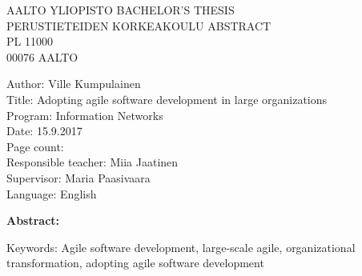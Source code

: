 
\begin{flushleft}
AALTO YLIOPISTO \hfill BACHELOR'S THESIS \\
PERUSTIETEIDEN KORKEAKOULU \hfill ABSTRACT \\
PL 11000 \\
00076 AALTO \\
\end{flushleft}

\begin{minipage}{15cm}
\begin{framed}
    Author: Ville Kumpulainen \\
    Title: Adopting agile software development in large organizations \\
    Program: Information Networks \\
    Date: 15.9.2017 \\
		Page count:~\pageref{LastPage} \\
		Responsible teacher: Miia Jaatinen \\
		Supervisor: Maria Paasivaara \\
		Language: English
\end{framed}
\end{minipage}

\bigskip

{\large\bfseries Abstract: \par}
\lipsum[1]
\lipsum[2]

\medskip

\begin{minipage}{15cm}
\begin{framed}
		Keywords: Agile software development, large-scale agile, organizational
		transformation, adopting agile software development
\end{framed}
\end{minipage}
